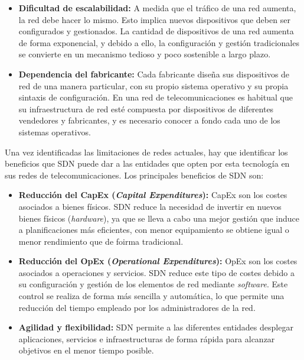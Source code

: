 \begin{itemize}
	\item \textbf{Dificultad de escalabilidad:} A medida que el tráfico de una red aumenta, la red debe hacer lo mismo. Esto implica nuevos dispositivos que deben ser configurados y gestionados. La cantidad de dispositivos de una red aumenta de forma exponencial, y debido a ello, la configuración y gestión tradicionales se convierte en un mecanismo tedioso y poco sostenible a largo plazo.
	
	\item \textbf{Dependencia del fabricante:} Cada fabricante diseña sus dispositivos de red de una manera particular, con su propio sistema operativo y su propia sintaxis de configuración. En una red de telecomunicaciones es habitual que su infraestructura de red esté compuesta por dispositivos de diferentes vendedores y fabricantes, y es necesario conocer a fondo cada uno de los sistemas operativos.
	
\end{itemize}

Una vez identificadas las limitaciones de redes actuales, hay que identificar los beneficios que SDN puede dar a las entidades que opten por esta tecnología en sus redes de telecomunicaciones. Los principales beneficios de SDN son:

\begin{itemize}
	\item \textbf{Reducción del CapEx (\textit{Capital Expenditures}):} CapEx son los costes asociados a bienes físicos. SDN reduce la necesidad de invertir en nuevos bienes físicos (\textit{hardware}), ya que se lleva a cabo una mejor gestión que induce a planificaciones más eficientes, con menor equipamiento se obtiene igual o menor rendimiento que de foirma tradicional.
	
	\item \textbf{Reducción del OpEx (\textit{Operational Expenditures}):} OpEx son los costes asociados a operaciones y servicios. SDN reduce este tipo de costes debido a su configuración y gestión de los elementos de red mediante \textit{software}. Este control se realiza de forma más sencilla y automática, lo que permite una reducción del tiempo empleado por los administradores de la red.
	
	\item \textbf{Agilidad y flexibilidad:} SDN permite a las diferentes entidades desplegar aplicaciones, servicios e infraestructuras de forma rápida para alcanzar objetivos en el menor tiempo posible.
\end{itemize}

